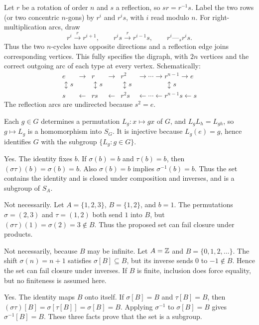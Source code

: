 Let $r$ be a rotation of order $n$ and $s$ a reflection, so $sr=r^{-1}s$. Label the two rows (or two concentric $n$-gons) by $r^i$ and $r^is$, with $i$ read modulo $n$. For right-multiplication arcs, draw
\[r^i\xrightarrow{\ r\ }r^{i+1},\qquad
r^is\xrightarrow{\ r\ }r^{i-1}s,\qquad r^i\mathrel{\text{---}_{s}}r^is.\]
Thus the two $n$-cycles have opposite directions and a reflection edge joins corresponding vertices. This fully specifies the digraph, with $2n$ vertices and the correct outgoing arc of each type at every vertex. Schematically:
\[\begin{array}{cccccc}
e&\longrightarrow&r&\longrightarrow&r^2&\longrightarrow\cdots\longrightarrow r^{n-1}\longrightarrow e\\
\updownarrow s&&\updownarrow s&&\updownarrow s&\qquad\qquad\updownarrow s\\
s&\longleftarrow&rs&\longleftarrow&r^2s&\longleftarrow\cdots\longleftarrow r^{n-1}s\longleftarrow s
\end{array}\]
The reflection arcs are undirected because $s^2=e$.

Each $g\in G$ determines a permutation $L_g:x\mapsto gx$ of $G$, and $L_gL_h=L_{gh}$, so $g\mapsto L_g$ is a homomorphism into $S_G$. It is injective because $L_g(e)=g$, hence identifies $G$ with the subgroup $\{L_g:g\in G\}$.

Yes. The identity fixes $b$. If $\sigma(b)=b$ and $\tau(b)=b$, then $(\sigma\tau)(b)=\sigma(b)=b$. Also $\sigma(b)=b$ implies $\sigma^{-1}(b)=b$. Thus the set contains the identity and is closed under composition and inverses, and is a subgroup of $S_A$.

Not necessarily. Let $A=\{1,2,3\}$, $B=\{1,2\}$, and $b=1$. The permutations $\sigma=(2,3)$ and $\tau=(1,2)$ both send $1$ into $B$, but $(\sigma\tau)(1)=\sigma(2)=3\notin B$. Thus the proposed set can fail closure under products.

Not necessarily, because $B$ may be infinite. Let $A=\mathbb{Z}$ and $B=\{0,1,2,\ldots\}$. The shift $\sigma(n)=n+1$ satisfies $\sigma[B]\subseteq B$, but its inverse sends $0$ to $-1\notin B$. Hence the set can fail closure under inverses. If $B$ is finite, inclusion does force equality, but no finiteness is assumed here.

Yes. The identity maps $B$ onto itself. If $\sigma[B]=B$ and $\tau[B]=B$, then $(\sigma\tau)[B]=\sigma[\tau[B]]=\sigma[B]=B$. Applying $\sigma^{-1}$ to $\sigma[B]=B$ gives $\sigma^{-1}[B]=B$. These three facts prove that the set is a subgroup.

